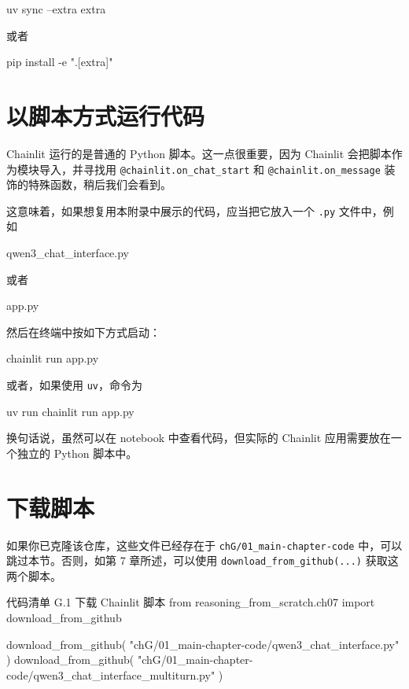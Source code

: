 \begin{codebox}
uv sync --extra extra
\end{codebox}

或者

\begin{codebox}
pip install -e ".[extra]"
\end{codebox}

\section{以脚本方式运行代码}

Chainlit 运行的是普通的 Python 脚本。这一点很重要，因为 Chainlit 会把脚本作为模块导入，并寻找用 \texttt{@chainlit.on\_chat\_start} 和 \texttt{@chainlit.on\_message} 装饰的特殊函数，稍后我们会看到。

这意味着，如果想复用本附录中展示的代码，应当把它放入一个 \texttt{.py} 文件中，例如

\begin{codebox}
qwen3_chat_interface.py
\end{codebox}

或者

\begin{codebox}
app.py
\end{codebox}

然后在终端中按如下方式启动：

\begin{codebox}
chainlit run app.py
\end{codebox}

或者，如果使用 \texttt{uv}，命令为

\begin{codebox}
uv run chainlit run app.py
\end{codebox}

换句话说，虽然可以在 notebook 中查看代码，但实际的 Chainlit 应用需要放在一个独立的 Python 脚本中。

\section{下载脚本}

如果你已克隆该仓库，这些文件已经存在于 \texttt{chG/01\_main-chapter-code} 中，可以跳过本节。否则，如第 7 章所述，可以使用 \texttt{download\_from\_github(...)} 获取这两个脚本。

\begin{codeboxt}{代码清单 G.1 下载 Chainlit 脚本}
from reasoning_from_scratch.ch07 import download_from_github

download_from_github(
    "chG/01_main-chapter-code/qwen3_chat_interface.py"
)
download_from_github(
    "chG/01_main-chapter-code/qwen3_chat_interface_multiturn.py"
)
\end{codeboxt}

